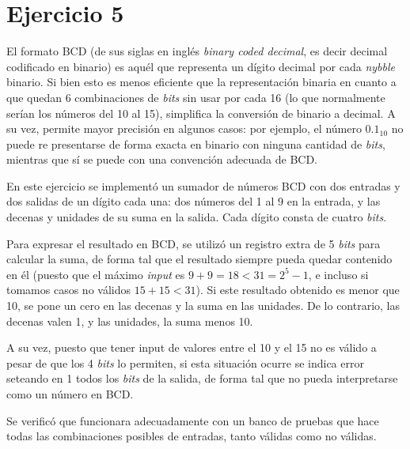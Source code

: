 \documentclass[../../../informe/src/main.tex]{subfiles}
\begin{document}
\section{Ejercicio 5}

El formato BCD (de sus siglas en ingl\'es \textit{binary coded decimal}, es decir decimal codificado en binario) es aqu\'el que representa un d\'igito decimal por cada \textit{nybble} binario. Si bien esto es menos eficiente que la representaci\'on binaria en cuanto a que quedan 6 combinaciones de \textit{bits} sin usar por cada 16 (lo que normalmente ser\'ian los n\'umeros del 10 al 15), simplifica la conversi\'on de binario a decimal. A su vez, permite mayor precisi\'on en algunos casos: por ejemplo, el n\'umero $0.1_{10}$ no puede re presentarse de forma exacta en binario con ninguna cantidad de \textit{bits}, mientras que s\'i se puede con una convenci\'on adecuada de BCD.\par

En este ejercicio se implement\'o un sumador de n\'umeros BCD con dos entradas y dos salidas de un d\'igito cada una: dos n\'umeros del 1 al 9 en la entrada, y las decenas y unidades de su suma en la salida. Cada d\'igito consta de cuatro \textit{bits}. \par

Para expresar el resultado en BCD, se utiliz\'o un registro extra de 5 \textit{bits} para calcular la suma, de forma tal que el resultado siempre pueda quedar contenido en \'el (puesto que el m\'aximo \textit{input} es $9+9 = 18 < 31 = 2^5-1$, e incluso si tomamos casos no v\'alidos $15+15<31$). Si este resultado obtenido es menor que 10, se pone un cero en las decenas y la suma en las unidades. De lo contrario, las decenas valen 1, y las unidades, la suma menos 10.\par

A su vez, puesto que tener input de valores entre el 10 y el 15 no es v\'alido a pesar de que los 4 \textit{bits} lo permiten, si esta situaci\'on ocurre se indica error seteando en 1 todos los \textit{bits} de la salida, de forma tal que no pueda interpretarse como un n\'umero en BCD. \par

Se verific\'o que funcionara adecuadamente con un banco de pruebas que hace todas las combinaciones posibles de entradas, tanto v\'alidas como no v\'alidas.\par
\end{document}
